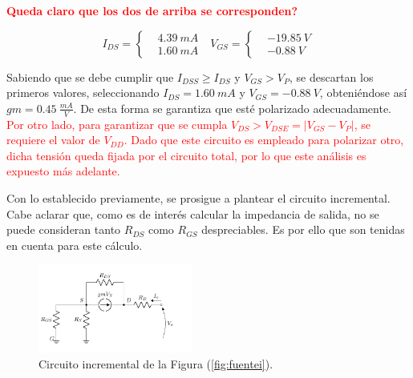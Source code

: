 \begin{center}
	\LARGE{\textcolor{red}{\textbf{Queda claro que los dos de arriba se corresponden?}}}
\end{center}

\begin{equation*}
I_{DS} = \left\lbrace
\begin{split}
	& 4.39 \ mA \\
	& 1.60 \ mA
\end{split}
\right.
\ \ \
V_{GS} = \left\lbrace
\begin{split}
	& -19.85 \ V \\
	& -0.88 \ V
\end{split}
\right.
\end{equation*}

Sabiendo que se debe cumplir que $I_{DSS} \geq I_{DS}$ y $V_{GS} > V_{P}$, se descartan los primeros valores, seleccionando $I_{DS} = 1.60 \ mA$ y $V_{GS} = -0.88 \ V$, obteniéndose así $gm = 0.45 \ \frac{mA}{V}$. De esta forma se garantiza que esté polarizado adecuadamente. \textcolor{red}{Por otro lado, para garantizar que se cumpla $V_{DS} > V_{DSE} = |V_{GS} - V_P|$, se requiere el valor de $V_{DD}$. Dado que este circuito es empleado para polarizar otro, dicha tensión queda fijada por el circuito total, por lo que este análisis es expuesto más adelante.}  

Con lo establecido previamente, se prosigue a plantear el circuito incremental. Cabe aclarar que, como es de interés calcular la impedancia de salida, no se puede consideran tanto $R_{DS}$ como $R_{GS}$ despreciables. Es por ello que son tenidas en cuenta para este cálculo.
\begin{figure}[H]
\centering
	\includegraphics[width=0.45\textwidth, page=1]{Imagenes/ModeloIncremental.pdf}
	\caption{Circuito incremental de la Figura (\ref{fig:fuentei}).}
\label{fig:incfuente1}
\end{figure}


